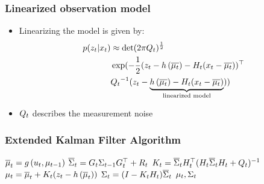 \begin{frame}
    \frametitle{Linearized observation model}
    
    \begin{itemize}
        \item Linearizing the model is given by:
    \begin{align*}
    p(z_{t} | x_{t}) &\approx \det(2 \pi Q_{t})^{\frac{1}{2}}\\
    &\exp (-\dfrac{1}{2} (z_{t} - h\left( \overline{\mu_{t}} \right) - H_{t}(x_{t} - \overline{\mu _{t}}))^{\top}\\
     &{Q_{t}}^{-1} (z_{t} - \underbrace{h\left( \overline{\mu_{t}} \right) - H_{t} (x_{t}-\overline{\mu_{t}})}_{\text{linearized model}}))
    \end{align*}
    
        \item $Q_{t}$ describes the measurement noise
    \end{itemize}

\end{frame}

\begin{frame}
    \frametitle{Extended Kalman Filter Algorithm}
   
    \begin{algorithmic}[1]
    \State $\overline{\mu}_{t} = g\left( u_{t}, \mu_{t-1} \right)$
    \State $\overline{\Sigma}_{t} = G_{t} \Sigma_{t-1} G_{t}^{\top}+R_{t}$
    \Statex
    \State $K_{t} = \overline{\Sigma}_{t} H_{t}^{\top} (H_{t} \overline{\Sigma}_{t} H_{t} + Q_{t})^{-1} $
    \State $\mu_{t} = \overline{\mu}_{t} + K_{t} (z_{t} - h\left( \overline{\mu}_{t} \right))$
    \State $\Sigma_{t} = (I - K_{t} H_{t}) \overline{\Sigma}_{t}$
    \State \Return $\mu_{t}, \Sigma_{t}$
    \EndProcedure
    \end{algorithmic}
\end{frame}
   
